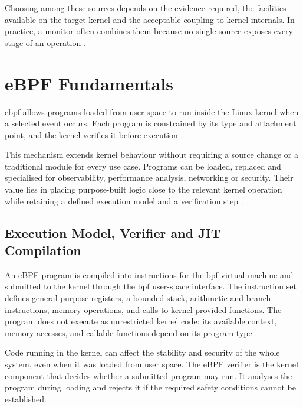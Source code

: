 Choosing among these sources depends on the evidence required, the facilities
available on the target kernel and the acceptable coupling to kernel internals.
In practice, a monitor often combines them because no single source exposes
every stage of an operation
\cite{linux_tracing_index,her2025ebpfsecuritytools}.

\section{eBPF Fundamentals}
\label{sec:ebpf-fundamentals}

\gls{ebpf} allows programs loaded from user space to run inside the Linux
kernel when a selected event occurs. Each program is constrained by its type
and attachment point, and the kernel verifies it before execution
\cite{rfc9669_bpf_isa,linux2024ebpfuserspaceapi}.

This mechanism extends kernel behaviour without requiring a source change or a
traditional module for every use case. Programs can be loaded, replaced and
specialised for observability, performance analysis, networking or security.
Their value lies in placing purpose-built logic close to the relevant kernel
operation while retaining a defined execution model and a verification step
\cite{gbadamosi2024ebpf,linux2026ebpfverifier}.

\subsection{Execution Model, Verifier and JIT Compilation}
\label{subsec:ebpf-execution-verifier-jit}

An eBPF program is compiled into instructions for the \gls{bpf} virtual machine and
submitted to the kernel through the \gls{bpf} user-space interface. The instruction
set defines general-purpose registers, a bounded stack, arithmetic and branch
instructions, memory operations, and calls to kernel-provided functions. The
program does not execute as unrestricted kernel code: its available context,
memory accesses, and callable functions depend on its program type
\cite{rfc9669_bpf_isa,linux_bpf_helpers}.

Code running in the kernel can affect the stability and security of the whole
system, even when it was loaded from user space. The eBPF verifier is the kernel
component that decides whether a submitted program may run. It analyses the
program during loading and rejects it if the required safety conditions cannot
be established.

